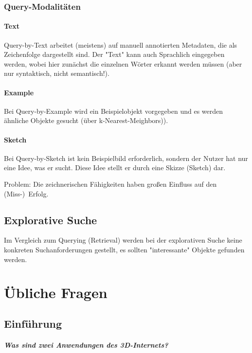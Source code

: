 		\subsection{Query-Modalitäten}
			\subsubsection{Text} 
				Query-by-Text arbeitet (meistens) auf manuell annotierten Metadaten, die als Zeichenfolge dargestellt sind. Der "Text" kann auch Sprachlich eingegeben werden, wobei hier zunächst die einzelnen Wörter erkannt werden müssen (aber nur syntaktisch, nicht semantisch!).

			\subsubsection{Example}
				Bei Query-by-Example wird ein Beispielobjekt vorgegeben und es werden ähnliche Objekte gesucht (\zB über k-Nearest-Meighbors)).

			\subsubsection{Sketch}
				Bei Query-by-Sketch ist kein Beispielbild erforderlich, sondern der Nutzer hat nur eine Idee, was er sucht. Diese Idee stellt er durch eine Skizze (Sketch) dar.
				
				Problem: Die zeichnerischen Fähigkeiten haben großen Einfluss auf den (Miss-)~Erfolg.

	\section{Explorative Suche}
		Im Vergleich zum Querying (Retrieval) werden bei der explorativen Suche keine konkreten Suchanforderungen gestellt, \dh es sollten "interessante" Objekte gefunden werden.





\appendix

\chapter{Übliche Fragen}
	\section{Einführung}
		\paragraph{Was sind zwei Anwendungen des 3D-Internets?}

